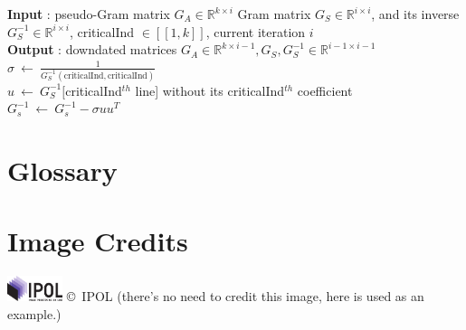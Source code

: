 \documentclass{ipol}
\newcommand{\dsize}{k}
\begin{document}
\begin{algorithm}[H]

\SetLine
\textbf{Input} : pseudo-Gram matrix $G_A \in \mathbb{R}^{\dsize \times i}$
Gram matrix $G_S \in \mathbb{R}^{i \times i}$, and its 
inverse $G_S^{-1}\in \mathbb{R}^{i \times i}$, criticalInd $\in [\![1, \dsize]\!]$, current iteration $i$\\
\textbf{Output} : downdated matrices $G_A \in \mathbb{R}^{\dsize \times i-1}, G_S, G_S^{-1} \in \mathbb{R}^{i-1 \times i-1}$\\

$\sigma \ \leftarrow \ \frac{1}{G_S^{-1}(\text{criticalInd}, \text{criticalInd})}$\\
$u \ \leftarrow \ G_S^{-1} [$criticalInd$^{th}$ line] without its criticalInd$^{th}$ coefficient\\
$G_s^{-1} \ \leftarrow \ G_s^{-1}-\sigma u u^T$\\

\caption{\textit{downdateGram} {\color{blue} Marc: Algo correspondant, mais \`a valider.}}

\end{algorithm}

\section*{Glossary}



\section*{Image Credits}

\includegraphics[height=2em]{ipol_logo} \copyright\ IPOL (there's no
need to credit this image, here is used as an example.)
\end{document}
